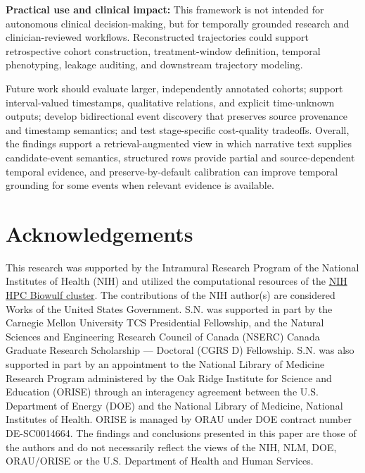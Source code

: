\documentclass{ws-procs11x85}
\newif\ifshowrebuttalcolor
\newcommand{\rebuttal}[1]{%
  \ifshowrebuttalcolor
    \textcolor{rebuttalblue}{#1}%
  \else
    #1%
  \fi
}
\begin{document}
\vspace{5pt}
\noindent\textbf{Practical use and clinical impact:} This framework is not intended for autonomous clinical decision-making, but for temporally grounded research and clinician-reviewed workflows. Reconstructed trajectories could support retrospective cohort construction, treatment-window definition, temporal phenotyping, leakage auditing, and downstream trajectory modeling.
\rebuttal{Future work should evaluate larger, independently annotated cohorts; support interval-valued timestamps, qualitative relations, and explicit time-unknown outputs; develop bidirectional event discovery that preserves source provenance and timestamp semantics; and test stage-specific cost-quality tradeoffs. 
Overall, the findings support a retrieval-augmented view in which narrative text supplies candidate-event semantics, structured rows provide partial and source-dependent temporal evidence, and preserve-by-default calibration can improve temporal grounding for some events when relevant evidence is available.}

\vspace{-3mm}
\section*{Acknowledgements}
This research was supported by the Intramural Research Program of the National Institutes of Health (NIH) and utilized the computational resources of the \href{http://hpc.nih.gov}{NIH HPC Biowulf cluster}. The contributions of the NIH author(s) are considered Works of the United States Government. 
S.N. was supported in part by the Carnegie Mellon University TCS Presidential Fellowship, and the Natural Sciences and Engineering Research Council of Canada (NSERC) Canada Graduate Research Scholarship --- Doctoral (CGRS D) Fellowship.
S.N. was also supported in part by an appointment to the National Library of Medicine Research Program administered by the Oak Ridge Institute for Science and Education (ORISE) through an interagency agreement between the U.S. Department of Energy (DOE) and the National Library of Medicine, National Institutes of Health. ORISE is managed by ORAU under DOE contract number DE-SC0014664. 
The findings and conclusions presented in this paper are those of the authors and do not necessarily reflect the views of the NIH, NLM, DOE, ORAU/ORISE or the U.S. Department of Health and Human Services. 





\end{document}
